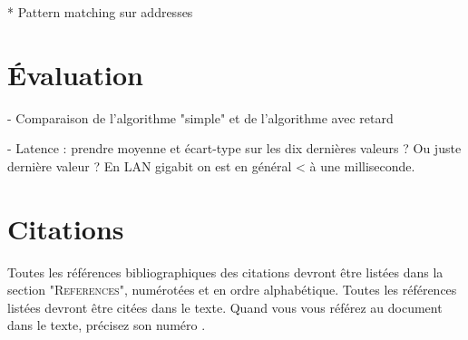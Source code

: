 \documentclass{article}
\begin{document}
* Pattern matching sur addresses 

\section{Évaluation}\label{sec.evaluation}
- Comparaison de l'algorithme "simple" et de l'algorithme avec retard


- Latence : prendre moyenne et écart-type sur les dix dernières valeurs ? Ou juste dernière valeur ?
En LAN gigabit on est en général < à une milliseconde.

\section{Citations}

Toutes les références bibliographiques des citations devront être listées dans la section "\textsc{References}", numérotées et en ordre alphabétique. Toutes les références  listées devront être citées dans le texte. Quand  vous vous référez au document dans le texte, précisez son numéro \cite{Author:00}.


\end{document}
